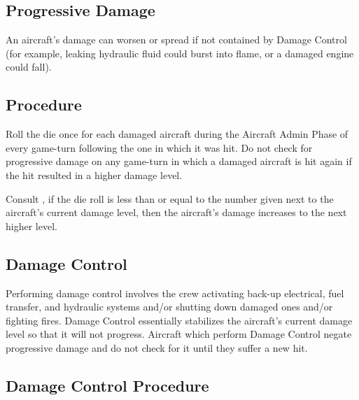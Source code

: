 
\begin{advancedrules}

    \section{Progressive Damage}
    \label{rule:progressive-damage}


    An aircraft's damage can worsen or spread if not contained by Damage Control (for example, leaking hydraulic fluid could burst into flame, or a damaged engine could fall).

    \subsection{Procedure} Roll the die once for each damaged aircraft during the Aircraft Admin Phase of every game-turn following the one in which it was hit. Do not check for progressive damage on any game-turn in which a damaged aircraft is hit again if the hit resulted in a higher damage level.

    Consult , if the die roll is less than or equal to the number given next to the aircraft's current damage level, then the aircraft's damage increases to the next higher level.

    \subsection{Damage Control} Performing damage control involves the crew activating back-up electrical, fuel transfer, and hydraulic systems and/or shutting down damaged ones and/or fighting fires. Damage Control essentially stabilizes the aircraft's current damage level so that it will not progress. Aircraft which perform Damage Control negate progressive damage and do not check for it until they suffer a new hit.

    \subsection{Damage Control Procedure}


\end{advancedrules}
